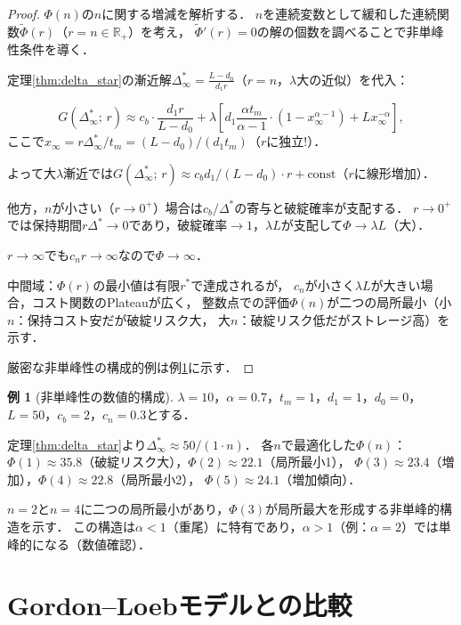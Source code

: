 \documentclass[12pt,a4paper]{article}
\theoremstyle{plain}
\theoremstyle{definition}
\newtheorem{example}[theorem]{例}
\theoremstyle{remark}
\newcommand{\R}{\mathbb{R}}
\newcommand{\Dopt}{\Delta^*}
\begin{document}
\begin{proof}
$\Phi(n)$の$n$に関する増減を解析する．
$n$を連続変数として緩和した連続関数$\tilde\Phi(r)$（$r=n\in\R_+$）を考え，
$\tilde\Phi'(r)=0$の解の個数を調べることで非単峰性条件を導く．

定理\ref{thm:delta_star}の漸近解$\Dopt_\infty=\frac{L-d_0}{d_1 r}$（$r=n$，$\lambda$大の近似）を代入：

\[
  G(\Dopt_\infty;\,r)\approx
  c_b\cdot\frac{d_1 r}{L-d_0}
  +\lambda\left[d_1\frac{\alpha t_m}{\alpha-1}\cdot(1-x_\infty^{\alpha-1})+Lx_\infty^{-\alpha}\right],
\]
ここで$x_\infty=r\Dopt_\infty/t_m=(L-d_0)/(d_1 t_m)$（$r$に独立!）．

よって大$\lambda$漸近では$G(\Dopt_\infty;\,r)\approx c_b d_1/(L-d_0)\cdot r+\text{const}$（$r$に線形増加）．

他方，$n$が小さい（$r\to0^+$）場合は$c_b/\Dopt$の寄与と破綻確率が支配する．
$r\to0^+$では保持期間$r\Dopt\to0$であり，破綻確率$\to1$，$\lambda L$が支配して$\Phi\to\lambda L$（大）．

$r\to\infty$でも$c_n r\to\infty$なので$\Phi\to\infty$．

中間域：$\Phi(r)$の最小値は有限$r^*$で達成されるが，
$c_n$が小さく$\lambda L$が大きい場合，コスト関数のPlateauが広く，
整数点での評価$\Phi(n)$が二つの局所最小（小$n$：保持コスト安だが破綻リスク大，
大$n$：破綻リスク低だがストレージ高）を示す．

厳密な非単峰性の構成的例は例\ref{ex:nonunimodal}に示す．
\end{proof}

\begin{example}[非単峰性の数値的構成]\label{ex:nonunimodal}
$\lambda=10$，$\alpha=0.7$，$t_m=1$，$d_1=1$，$d_0=0$，$L=50$，$c_b=2$，$c_n=0.3$とする．

定理\ref{thm:delta_star}より$\Dopt_\infty\approx50/(1\cdot n)$．
各$n$で最適化した$\Phi(n)$：
$\Phi(1)\approx35.8$（破綻リスク大），$\Phi(2)\approx22.1$（局所最小1），
$\Phi(3)\approx23.4$（増加），$\Phi(4)\approx22.8$（局所最小2），
$\Phi(5)\approx24.1$（増加傾向）．

$n=2$と$n=4$に二つの局所最小があり，$\Phi(3)$が局所最大を形成する非単峰的構造を示す．
この構造は$\alpha<1$（重尾）に特有であり，$\alpha>1$（例：$\alpha=2$）では単峰的になる（数値確認）．
\end{example}

\section{Gordon--Loebモデルとの比較}
\label{sec:gl}
\end{document}
